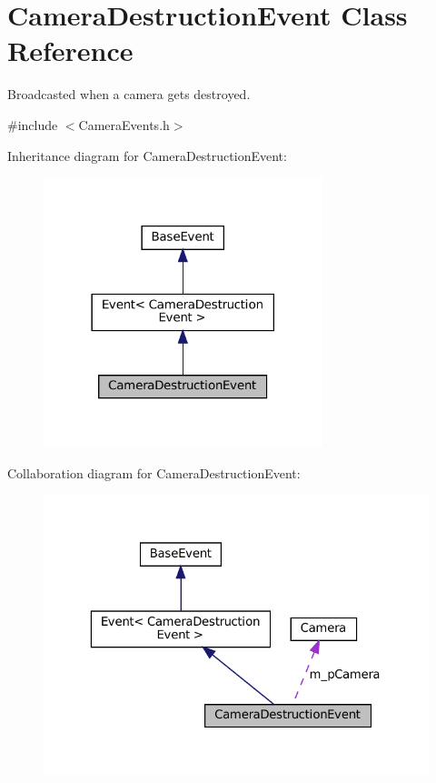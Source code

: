 \hypertarget{classCameraDestructionEvent}{}\section{Camera\+Destruction\+Event Class Reference}
\label{classCameraDestructionEvent}


Broadcasted when a camera gets destroyed.  




{\ttfamily \#include $<$Camera\+Events.\+h$>$}



Inheritance diagram for Camera\+Destruction\+Event\+:\nopagebreak
\begin{figure}[H]
\begin{center}
\leavevmode
\includegraphics[width=230pt]{classCameraDestructionEvent__inherit__graph}
\end{center}
\end{figure}


Collaboration diagram for Camera\+Destruction\+Event\+:\nopagebreak
\begin{figure}[H]
\begin{center}
\leavevmode
\includegraphics[width=323pt]{classCameraDestructionEvent__coll__graph}
\end{center}
\end{figure}
